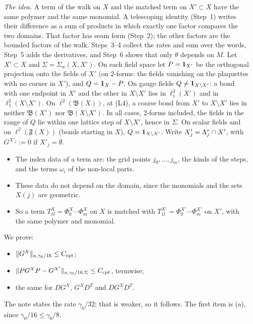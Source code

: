 \begin{detail}\label{d9:wi-b}
\emph{The idea.} A term of the walk on $X$ and the matched term on $X'\subset X$ have the same polymer and the same monomial. A telescoping identity (Step~1) writes their difference as a sum of products in which exactly one factor compares the two domains. That factor has seam form (Step~2); the other factors are the bounded factors of the walk. Steps~3--4 collect the rates and sum over the words, Step~5 adds the derivatives, and Step~6 shows that only $\theta$ depends on $M$.
Let $X'\subset X$ and $\Sigma=\Sigma_w(X,X')$. On each field space let $P=\mathbf 1_{X'}$ be the orthogonal projection onto the fields of $X'$ (on $2$-forms: the fields vanishing on the plaquettes with no corner in $X'$), and $Q=\mathbf 1_X-P$. On gauge fields $Q\ne\mathbf 1_{X\setminus X'}$: a bond with one endpoint in $X'$ and the other in $X\setminus X'$ lies in $\ell^2_1(X')$ and in $\ell^2_1(X\setminus X')$. On $\ell^2(\mathfrak B(X))$, at (L4), a coarse bond from $X'$ to $X\setminus X'$ lies in neither $\mathfrak B(X')$ nor $\mathfrak B(X\setminus X')$. In all cases, $2$-forms included, the fields in the range of $Q$ lie within one lattice step of $X\setminus X'$, hence in $\Sigma$. On scalar fields and on $\ell^2(\mathfrak F(X))$ (bonds starting in $X$), $Q=\mathbf 1_{X\setminus X'}$. Write $X'_j=\Lambda^v_j\cap X'$, with $G^{X'_j}:=0$ if $X'_j=\emptyset$.
\begin{itemize}
\item The index data of a term are: the grid points $j_0,\dots,j_m$, the kinds of the steps, and the terms $\omega_i$ of the non-local parts.
\item These data do not depend on the domain, since the monomials and the sets $X(j)$ are geometric.
\item So a term $T^X_\Omega=\Phi^X_0\cdots\Phi^X_m$ on $X$ is matched with $T^{X'}_\Omega=\Phi^{X'}_0\cdots\Phi^{X'}_m$ on $X'$, with the same polymer and monomial.
\end{itemize}
We prove:
\begin{itemize}
\item $\|G^X\|_{\kappa,\gamma_0/16}\le C_{\rm cpt}$;
\item $\|PG^XP-G^{X'}\|_{\kappa,\gamma_0/16,\Sigma}\le C_{\rm cpt}$, termwise;
\item the same for $DG^X$, $G^XD^T$ and $DG^XD^T$.
\end{itemize}
The note states the rate $\gamma_0/32$; that is weaker, so it follows. The first item is (a), since $\gamma_0/16\le\gamma_0/8$.

\end{detail}
